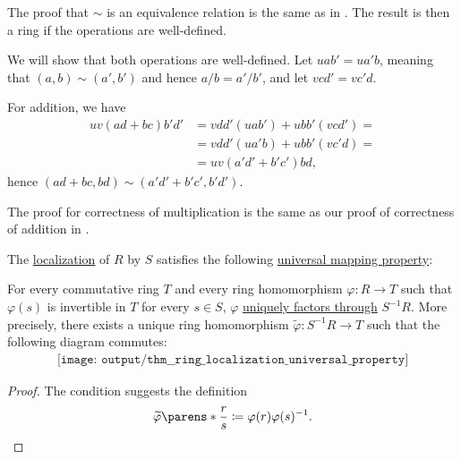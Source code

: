 \begin{defproof}
  The proof that \( {\sim} \) is an equivalence relation is the same as in . The result is then a ring if the operations are well-defined.

  We will show that both operations are well-defined. Let \( u ab' = u a'b \), meaning that \( (a, b) \sim (a', b') \) and hence \( a / b = {a'} / {b'} \), and let \( v cd' = v c'd \).

  For addition, we have
  \begin{align*}
    u v (ad + bc) b' d'
    &=
    v dd' (u ab') + u bb' (v cd')
    = \\ &=
    v dd' (u a'b) + u bb' (v c'd)
    = \\ &=
    u v (a'd' + b'c') b d,
  \end{align*}
  hence \( (ad + bc, bd) \sim (a'd' + b'c', b'd') \).

  The proof for correctness of multiplication is the same as our proof of correctness of addition in .
\end{defproof}

\begin{theorem}\label{thm:ring_localization_universal_property}
  The \hyperref[def:ring_localization]{localization} of \( R \) by \( S \) satisfies the following \hyperref[rem:universal_mapping_property]{universal mapping property}:
  \begin{displayquote}
    For every commutative ring \( T \) and every ring homomorphism \( \varphi: R \to T \) such that \( \varphi(s) \) is invertible in \( T \) for every \( s \in S \), \( \varphi \) \hyperref[def:factors_through]{uniquely factors through} \( S^{-1} R \). More precisely, there exists a unique ring homomorphism \( \widetilde{\varphi}: S^{-1} R \to T \) such that the following diagram commutes:
    \begin{equation}\label{eq:thm:ring_localization_universal_property/diagram}
      \begin{aligned}
        \texttt{[image: output/thm\_\_ring\_localization\_universal\_property]}
      \end{aligned}
    \end{equation}
  \end{displayquote}
\end{theorem}
\begin{proof}
  The condition suggests the definition
  \begin{equation*}
    \widetilde{\varphi}\parens*{ \frac r s } \coloneqq \varphi(r) \varphi(s)^{-1}.
  \end{equation*}
\end{proof}

